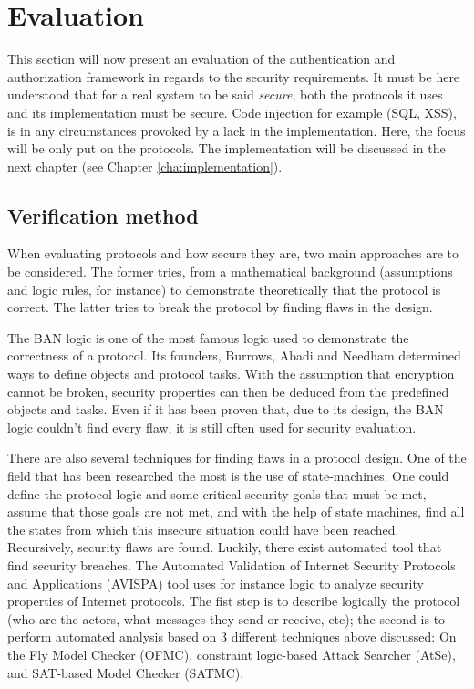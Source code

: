 \chapter{Evaluation}
\label{cha:evaluation}
This section will now present an evaluation of the authentication and authorization framework in regards to the security requirements. It must be here understood that for a real system to be said \textit{secure}, both the protocols it uses and its implementation must be secure. Code injection for example (SQL, XSS), is in any circumstances provoked by a lack in the implementation. Here, the focus will be only put on the protocols. The implementation will be discussed in the next chapter (see Chapter \ref{cha:implementation}).

\section{Verification method}
When evaluating protocols and how secure they are, two main approaches are to be considered. The former tries, from a mathematical background (assumptions and logic rules, for instance) to demonstrate theoretically that the protocol is correct. The latter tries to break the protocol by finding flaws in the design.

The BAN logic is one of the most famous logic used to demonstrate the correctness of a protocol. Its founders,  Burrows, Abadi and Needham determined ways to define objects and protocol tasks. With the assumption that encryption cannot be broken, security properties can then be deduced from the predefined objects and tasks. Even if it has been proven that, due to its design, the BAN logic couldn't find every flaw, it is still often used for security evaluation.

There are also several techniques for finding flaws in a protocol design. One of the field that has been researched the most is the use of state-machines. One could define the protocol logic and some critical security goals that must be met, assume that those goals are not met, and with the help of state machines, find all the states from which this insecure situation could have been reached. Recursively, security flaws are found. Luckily, there exist automated tool that find security breaches. The Automated Validation of Internet Security Protocols and Applications (AVISPA) tool uses for instance logic to analyze security properties of Internet protocols. The fist step is to describe logically the protocol (who are the actors, what messages they send or receive, etc); the second is to perform automated analysis based on 3 different techniques above discussed: On the Fly Model Checker (OFMC), constraint  logic-based Attack Searcher (AtSe), and SAT-based Model Checker (SATMC).

